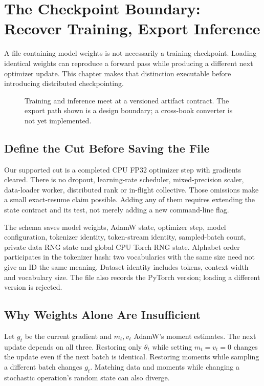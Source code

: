 \chapter[The Checkpoint Boundary]{The Checkpoint Boundary: Recover Training, Export Inference}
\label{ch:checkpoint-boundary}

A file containing model weights is not necessarily a training checkpoint.
Loading identical weights can reproduce a forward pass while producing a
different next optimizer update. This chapter makes that distinction executable
before introducing distributed checkpointing.

\begin{figure}[htbp]\centering

\caption{Training and inference meet at a versioned artifact contract. The
export path shown is a design boundary; a cross-book converter is not yet implemented.}
\label{fig:checkpoint-cut}
\end{figure}

\section{Define the Cut Before Saving the File}

Our supported cut is a completed CPU FP32 optimizer step with gradients cleared.
There is no dropout, learning-rate scheduler, mixed-precision scaler, data-loader
worker, distributed rank or in-flight collective. Those omissions make a small
exact-resume claim possible. Adding any of them requires extending the state
contract and its test, not merely adding a new command-line flag.

The schema saves model weights, AdamW state, optimizer step, model configuration,
tokenizer identity, token-stream identity, sampled-batch count, private data RNG
state and global CPU Torch RNG state. Alphabet order participates in the
tokenizer hash: two vocabularies with the same size need not give an ID the same
meaning. Dataset identity includes tokens, context width and vocabulary size.
The file also records the PyTorch version; loading a different version is rejected.

\section{Why Weights Alone Are Insufficient}

Let \(g_t\) be the current gradient and \(m_t,v_t\) AdamW's moment estimates.
The next update depends on all three. Restoring only \(\theta_t\) while setting
\(m_t=v_t=0\) changes the update even if the next batch is identical. Restoring
moments while sampling a different batch changes \(g_t\). Matching data and
moments while changing a stochastic operation's random state can also diverge.

